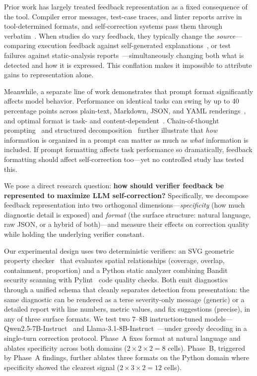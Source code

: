 Prior work has largely treated feedback representation as a fixed consequence of the tool.
Compiler error messages, test-case traces, and linter reports arrive in tool-determined formats, and self-correction systems pass them through verbatim~\cite{chen2024selfdebug,yang2024sweagent,yang2024intercode}.
When studies do vary feedback, they typically change the \emph{source}---comparing execution feedback against self-generated explanations~\cite{chen2024selfdebug}, or test failures against static-analysis reports~\cite{dolcetti2024feedbackcode}---simultaneously changing both what is detected and how it is expressed.
This conflation makes it impossible to attribute gains to representation alone.

Meanwhile, a separate line of work demonstrates that prompt format significantly affects model behavior.
Performance on identical tasks can swing by up to 40 percentage points across plain-text, Markdown, JSON, and YAML renderings~\cite{he2024promptformat}, and optimal format is task- and content-dependent~\cite{lau2025cfpo}.
Chain-of-thought prompting~\cite{wei2022cot} and structured decomposition~\cite{zhou2023leasttomost} further illustrate that \emph{how} information is organized in a prompt can matter as much as \emph{what} information is included.
If prompt formatting affects task performance so dramatically, feedback formatting should affect self-correction too---yet no controlled study has tested this.

We pose a direct research question: \textbf{how should verifier feedback be represented to maximize LLM self-correction?}
Specifically, we decompose feedback representation into two orthogonal dimensions---\emph{specificity} (how much diagnostic detail is exposed) and \emph{format} (the surface structure: natural language, raw JSON, or a hybrid of both)---and measure their effects on correction quality while holding the underlying verifier constant.

Our experimental design uses two deterministic verifiers: an SVG geometric property checker~\cite{cao2024svgenius} that evaluates spatial relationships (coverage, overlap, containment, proportion) and a Python static analyzer combining Bandit~\cite{bandit2024} security scanning with Pylint~\cite{pylint2024} code quality checks.
Both emit diagnostics through a unified schema that cleanly separates detection from presentation: the same diagnostic can be rendered as a terse severity-only message (generic) or a detailed report with line numbers, metric values, and fix suggestions (precise), in any of three surface formats.
We test two 7--8B instruction-tuned models---Qwen2.5-7B-Instruct~\cite{yang2024qwen25} and Llama-3.1-8B-Instruct~\cite{grattafiori2024llama3}---under greedy decoding in a single-turn correction protocol.
Phase~A fixes format at natural language and ablates specificity across both domains ($2 \times 2 \times 2 = 8$ cells).
Phase~B, triggered by Phase~A findings, further ablates three formats on the Python domain where specificity showed the clearest signal ($2 \times 3 \times 2 = 12$ cells).

